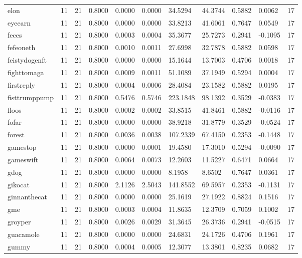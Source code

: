 \begin{table}[htbp]
\begin{tabular}{lllllllllll}
elon & 11 & 21 & 0.8000 & 0.0000 & 0.0000 & 34.5294 & 44.3744 & 0.5882 & 0.0062 & 17 \\
eyeearn & 11 & 21 & 0.8000 & 0.0000 & 0.0000 & 33.8213 & 41.6061 & 0.7647 & 0.0549 & 17 \\
feces & 11 & 21 & 0.8000 & 0.0003 & 0.0004 & 35.3677 & 25.7273 & 0.2941 & -0.1095 & 17 \\
fefeoneth & 11 & 21 & 0.8000 & 0.0010 & 0.0011 & 27.6998 & 32.7878 & 0.5882 & 0.0598 & 17 \\
feistydogenft & 11 & 21 & 0.8000 & 0.0000 & 0.0000 & 15.1644 & 13.7003 & 0.4706 & 0.0018 & 17 \\
fighttomaga & 11 & 21 & 0.8000 & 0.0009 & 0.0011 & 51.1089 & 37.1949 & 0.5294 & 0.0004 & 17 \\
firstreply & 11 & 21 & 0.8000 & 0.0004 & 0.0006 & 28.4084 & 23.1582 & 0.5882 & 0.0195 & 17 \\
fisttrumppump & 11 & 21 & 0.8000 & 0.5476 & 0.5746 & 223.1848 & 98.1392 & 0.3529 & -0.0383 & 17 \\
floos & 11 & 21 & 0.8000 & 0.0002 & 0.0002 & 33.8515 & 41.8461 & 0.5882 & -0.0116 & 17 \\
fofar & 11 & 21 & 0.8000 & 0.0000 & 0.0000 & 38.9218 & 31.8779 & 0.3529 & -0.0524 & 17 \\
forest & 11 & 21 & 0.8000 & 0.0036 & 0.0038 & 107.2339 & 67.4150 & 0.2353 & -0.1448 & 17 \\
gamestop & 11 & 21 & 0.8000 & 0.0000 & 0.0001 & 19.4580 & 17.3010 & 0.5294 & -0.0090 & 17 \\
gameswift & 11 & 21 & 0.8000 & 0.0064 & 0.0073 & 12.2603 & 11.5227 & 0.6471 & 0.0664 & 17 \\
gdog & 11 & 21 & 0.8000 & 0.0000 & 0.0000 & 8.1958 & 8.6502 & 0.7647 & 0.0361 & 17 \\
gikocat & 11 & 21 & 0.8000 & 2.1126 & 2.5043 & 141.8552 & 69.5957 & 0.2353 & -0.1131 & 17 \\
ginnanthecat & 11 & 21 & 0.8000 & 0.0000 & 0.0000 & 25.1619 & 27.1922 & 0.8824 & 0.1516 & 17 \\
gme & 11 & 21 & 0.8000 & 0.0003 & 0.0004 & 11.8635 & 12.3709 & 0.7059 & 0.1002 & 17 \\
groyper & 11 & 21 & 0.8000 & 0.0026 & 0.0029 & 31.3645 & 26.3736 & 0.2941 & -0.0515 & 17 \\
guacamole & 11 & 21 & 0.8000 & 0.0000 & 0.0000 & 24.6831 & 24.1726 & 0.4706 & 0.1961 & 17 \\
gummy & 11 & 21 & 0.8000 & 0.0004 & 0.0005 & 12.3077 & 13.3801 & 0.8235 & 0.0682 & 17 \\

\end{tabular}
\end{table}
